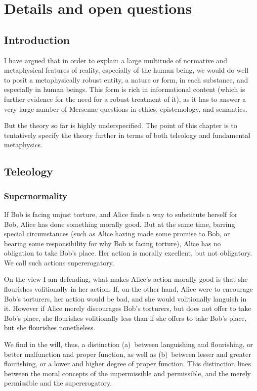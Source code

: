 \def\mychapter{X}

\chapter{Details and open questions}\label{ch:details}
\section{Introduction}
I have argued that in order to explain a large multitude of normative and metaphysical features 
of reality, especially of the human being, we would do well to posit a metaphysically robust 
entity, a nature or form, in each substance, and especially in human beings. This form is rich 
in informational content (which is further evidence for the need for a robust treatment of it), 
as it has to answer a very large number of Mersenne questions in ethics, epistemology, and semantics. 

But the theory so far is highly underspecified. The point of this chapter is to tentatively specify 
the theory further in terms of both teleology and fundamental metaphysics. 

\section{Teleology}
\subsection{Supernormality}
If Bob is facing unjust torture, and Alice finds a way to substitute herself for Bob, 
Alice has done something morally good. But at the same time, barring special circumstances
(such as Alice having made some promise to Bob, or bearing some responsibility for why
Bob is facing torture), Alice has no obligation to take Bob's place. Her action is morally
excellent, but not obligatory. We call such actions supererogatory.

On the view I am defending, what makes Alice's action morally good is that she 
flourishes volitionally in her action. If, on the other hand, Alice were to encourage Bob's 
torturers, her action would be bad, and she would volitionally languish in it. However if Alice
merely discourages Bob's torturers, but does not offer to take Bob's place, she flourishes
volitionally less than if she offers to take Bob's place, but she flourishes nonetheless.

We find in the will, thus, a distinction (a)~between languishing and flourishing, or 
better malfunction and proper function, as well as (b)~between lesser and greater flourishing,
or a lower and higher degree of proper function. This distinction lines between the moral concepts of
the impermissible and permissible, and the merely permissible and the supererogatory. 

